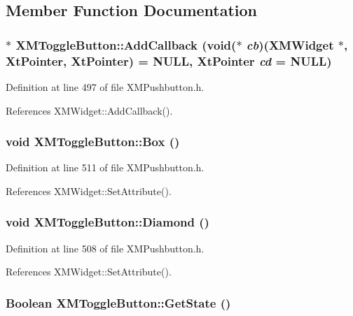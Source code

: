 \subsection{Member Function Documentation}
\subsubsection{$\ast$ XMToggle\-Button::Add\-Callback (void($\ast$ {\em cb})({\bf XMWidget} $\ast$, Xt\-Pointer, Xt\-Pointer) = NULL, Xt\-Pointer {\em cd} = NULL)\hspace{0.3cm}{\tt  [inline]}}\label{classXMToggleButton_a3}




Definition at line 497 of file XMPushbutton.h.

References XMWidget::Add\-Callback().
\subsubsection{\setlength{\rightskip}{0pt plus 5cm}void XMToggle\-Button::Box ()\hspace{0.3cm}{\tt  [inline]}}\label{classXMToggleButton_a7}




Definition at line 511 of file XMPushbutton.h.

References XMWidget::Set\-Attribute().
\subsubsection{\setlength{\rightskip}{0pt plus 5cm}void XMToggle\-Button::Diamond ()\hspace{0.3cm}{\tt  [inline]}}\label{classXMToggleButton_a6}




Definition at line 508 of file XMPushbutton.h.

References XMWidget::Set\-Attribute().
\subsubsection{\setlength{\rightskip}{0pt plus 5cm}Boolean XMToggle\-Button::Get\-State ()\hspace{0.3cm}{\tt  [inline]}}\label{classXMToggleButton_a11}




